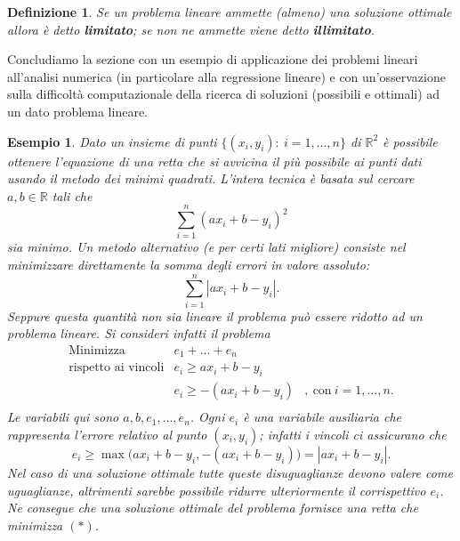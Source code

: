 \documentclass[italian, letter paper, 12pt, reqno]{article}
\theoremstyle{myteo}
\newtheorem{definition}[theorem]{Definizione}
\newtheorem{example}[theorem]{Esempio}
\numberwithin{equation}{section}
\begin{document}
\begin{definition}
  \label{def:problemi_limitati_e_illimitati}
  Se un problema lineare ammette (almeno) una soluzione ottimale allora è detto \textbf{limitato}; se non ne ammette viene detto \textbf{illimitato}.
\end{definition}

Concludiamo la sezione con un esempio di applicazione dei problemi lineari all'analisi numerica (in particolare alla regressione lineare) e con un'osservazione sulla difficoltà computazionale della ricerca di soluzioni (possibili e ottimali) ad un dato problema lineare.

\begin{example}
  \label{es:minimi_quadrati}
  Dato un insieme di punti \(\{(x_i, y_i)\colon\ i=1,\ldots,n\}\) di \(\mathbb{R}^2\) è possibile ottenere l'equazione di una retta che si avvicina il più possibile ai punti dati usando il \textit{metodo dei minimi quadrati}.
  L'intera tecnica è basata sul cercare \(a,b\in\mathbb{R}\) tali che
  \begin{equation*}
    \sum_{i=1}^n(ax_i + b - y_i)^2
  \end{equation*}
  sia minimo. Un metodo alternativo (e per certi lati migliore) consiste nel minimizzare direttamente la somma degli errori in valore assoluto:
  \begin{equation*}
    \tag{\(*\)}
    \sum_{i=1}^n|ax_i + b - y_i|.
  \end{equation*}
  Seppure questa quantità non sia lineare il problema può essere ridotto ad un problema lineare.
  Si consideri infatti il problema
  \begin{equation*}
    \begin{array}{lll}
      \text{Minimizza} & e_1 + \ldots + e_n &\\
      \text{rispetto ai vincoli} & e_i\geq ax_i + b - y_i &\\
                       & e_i\geq -(ax_i + b - y_i) &,\ \text{con}\ i = 1,\ldots, n.\\
    \end{array}
  \end{equation*}
  Le variabili qui sono \(a, b, e_1,\ldots, e_n\).
  Ogni \(e_i\) è una variabile ausiliaria che rappresenta l'errore relativo al punto \((x_i, y_i)\); infatti i vincoli ci assicurano che
  \[e_i\geq\max\big(ax_i + b - y_i, -(ax_i + b - y_i)\big) = |ax_i + b - y_i|.\]
  Nel caso di una soluzione ottimale tutte queste disuguaglianze devono valere come uguaglianze, altrimenti sarebbe possibile ridurre ulteriormente il corrispettivo \(e_i\).
  Ne consegue che una soluzione ottimale del problema fornisce una retta che minimizza \((*)\).
\end{example}
\end{document}
